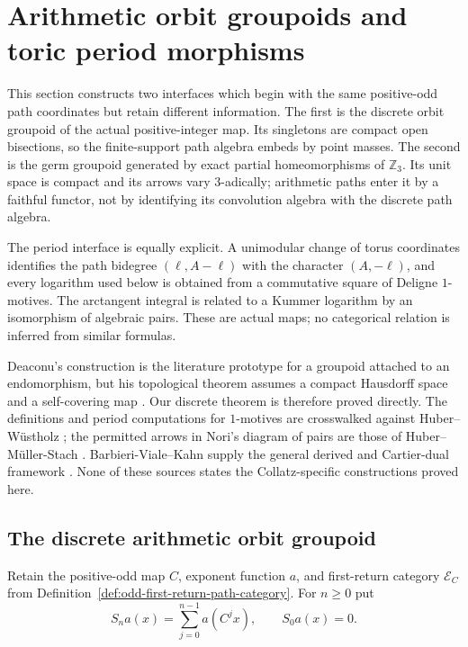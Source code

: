 \section{Arithmetic orbit groupoids and toric period morphisms}
\label{sec:groupoid-motivic-interfaces}

This section constructs two interfaces which begin with the same
positive-odd path coordinates but retain different information.  The first
is the discrete orbit groupoid of the actual positive-integer map.  Its
singletons are compact open bisections, so the finite-support path algebra
embeds by point masses.  The second is the germ groupoid generated by exact
partial homeomorphisms of $\mathbb Z_3$.  Its unit space is compact and its
arrows vary $3$-adically; arithmetic paths enter it by a faithful functor,
not by identifying its convolution algebra with the discrete path algebra.

The period interface is equally explicit.  A unimodular change of torus
coordinates identifies the path bidegree $(\ell,A-\ell)$ with the character
$(A,-\ell)$, and every logarithm used below is obtained from a commutative
square of Deligne $1$-motives.  The arctangent integral is related to a
Kummer logarithm by an isomorphism of algebraic pairs.  These are actual
maps; no categorical relation is inferred from similar formulas.

Deaconu's construction is the literature prototype for a groupoid attached
to an endomorphism, but his topological theorem assumes a compact Hausdorff
space and a self-covering map \cite[printed pp.~1779--1781]{Deaconu1995}.
Our discrete theorem is therefore proved directly.  The definitions and
period computations for $1$-motives are crosswalked against
Huber--W\"ustholz \cite[Definitions~8.1 and 10.2; Proposition~12.10]{HuberWustholz2022};
the permitted arrows in Nori's diagram of pairs are those of
Huber--M\"uller-Stach \cite[Definitions~7.1.4 and 9.1.1]{HuberMullerStach2025}.
Barbieri-Viale--Kahn supply the general derived and Cartier-dual framework
\cite[Section~1.1 and Theorem~2.1.2]{BarbieriVialeKahn2016}.  None of these
sources states the Collatz-specific constructions proved here.

\subsection{The discrete arithmetic orbit groupoid}

Retain the positive-odd map $C$, exponent function $a$, and first-return
category $\mathcal E_C$ from
Definition~\ref{def:odd-first-return-path-category}.  For $n\geq0$ put
\[
 S_na(x)=\sum_{j=0}^{n-1}a(C^jx),
 \qquad S_0a(x)=0.
\]

